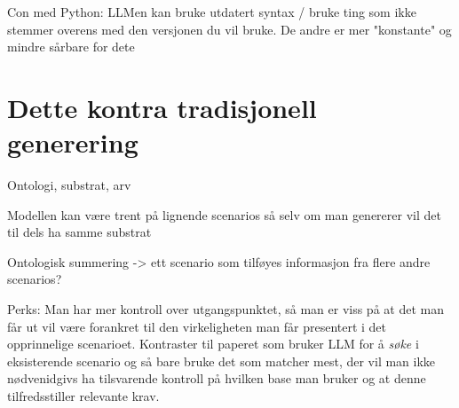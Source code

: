Con med Python: LLMen kan bruke utdatert syntax / bruke ting som ikke stemmer overens med den
versjonen du vil bruke. De andre er mer "konstante" og mindre sårbare for dete

\section{Dette kontra tradisjonell generering}

Ontologi, substrat, arv 

Modellen kan være trent på lignende scenarios så selv om man genererer vil det
til dels ha samme substrat 

Ontologisk summering -> ett scenario som tilføyes informasjon fra flere andre
scenarios? 

Perks: Man har mer kontroll over utgangspunktet, så man er viss på at det man
får ut vil være forankret til den virkeligheten man får presentert i det
opprinnelige scenarioet. Kontraster til paperet som bruker LLM for å \emph{søke} i
eksisterende scenario og så bare bruke det som matcher mest, der vil man ikke nødvenidgivs ha
tilsvarende kontroll på hvilken base man bruker og at denne tilfredsstiller
relevante krav.